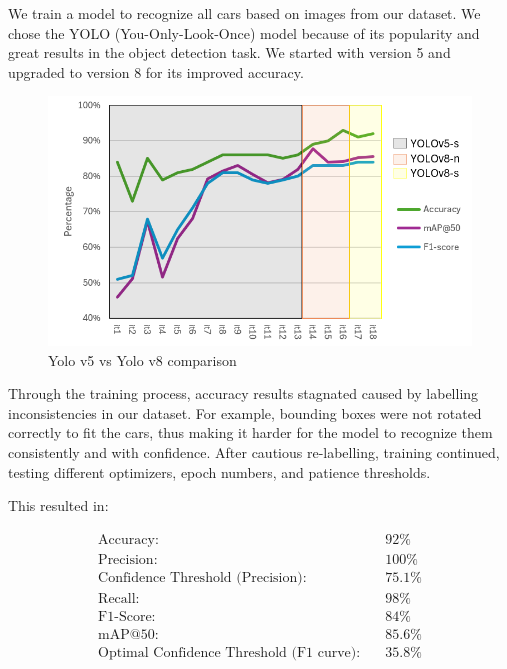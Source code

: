 \noindent{}We train a model to recognize all cars based on images from our
dataset. We chose the YOLO (You-Only-Look-Once) model because of its popularity
and great results in the object detection task. We started with version 5 and
upgraded to version 8 for its improved accuracy.

\begin{figure}[h]
  \centering
  \includegraphics[width=\columnwidth]{images/training_table1.png}
  \caption{Yolo v5 vs Yolo v8 comparison}
  \label{fig:parking_detection}
\end{figure}

\noindent{}Through the training process, accuracy results stagnated caused by
labelling inconsistencies in our dataset. For example, bounding boxes were not
rotated correctly to fit the cars, thus making it harder for the model to
recognize them consistently and with confidence. After cautious re-labelling,
training continued, testing different optimizers, epoch numbers, and patience
thresholds.

\noindent{}This resulted in:
\begin{mdframed}[innerleftmargin=0pt, innerrightmargin=0pt, innertopmargin=0pt, innerbottommargin=0pt]
\begin{align*}
\text{Accuracy:} & \quad 92\% \\
\text{Precision:} & \quad 100\% \\
\text{Confidence Threshold (Precision):} & \quad 75.1\% \\
\text{Recall:} & \quad 98\% \\
\text{F1-Score:} & \quad 84\% \\
\text{mAP@50:} & \quad 85.6\% \\
\text{Optimal Confidence Threshold (F1 curve):} & \quad 35.8\%
\\
\end{align*}
\end{mdframed}

